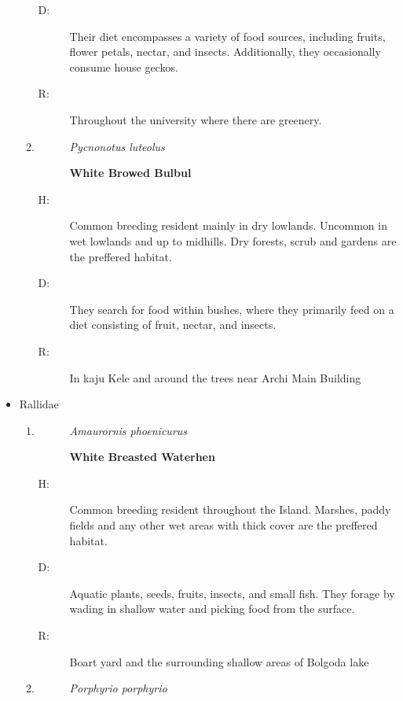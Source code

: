 \begin{itemize}
\begin{enumerate}
\begin{description}
\item[D: ]%
Their diet encompasses a variety of food sources, including fruits, flower petals, nectar, and insects. Additionally, they occasionally consume house geckos.%
\item[R: ]%
Throughout the university where there are greenery.%
\end{description}%
\item%
\begin{description}%
\item[]%
\textit{Pycnonotus luteolus}%
\item[]%
\textbf{White Browed Bulbul}%
\end{description}%
\begin{description}%
\item[H: ]%
Common breeding resident mainly in dry lowlands. Uncommon in wet lowlands and up to midhills. Dry forests, scrub and gardens are the preffered habitat.%
\item[D: ]%
They search for food within bushes, where they primarily feed on a diet consisting of fruit, nectar, and insects.%
\item[R: ]%
In kaju Kele and around the trees near Archi Main Building%
\end{description}%
\end{enumerate}%
\item%
Rallidae%
\begin{enumerate}%
\item%
\begin{description}%
\item[]%
\textit{Amaurornis phoenicurus}%
\item[]%
\textbf{White Breasted Waterhen}%
\end{description}%
\begin{description}%
\item[H: ]%
Common breeding resident throughout the Island. Marshes, paddy fields and any other wet areas with thick cover are the preffered habitat.%
\item[D: ]%
Aquatic plants, seeds, fruits, insects, and small fish. They forage by wading in shallow water and picking food from the surface.%
\item[R: ]%
Boart yard and the surrounding shallow areas of Bolgoda lake%
\end{description}%
\item%
\begin{description}%
\item[]%
\textit{Porphyrio porphyrio}%

\end{description}
\end{enumerate}
\end{itemize}
